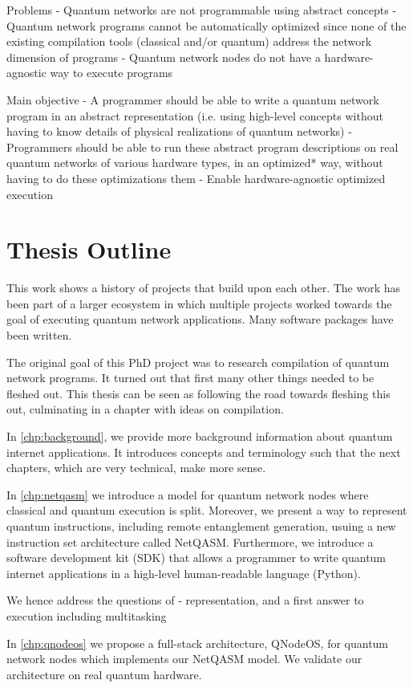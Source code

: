 Problems
- Quantum networks are not programmable using abstract concepts
- Quantum network programs cannot be automatically optimized since none of the existing compilation tools (classical and/or quantum) address the network dimension of programs
- Quantum network nodes do not have a hardware-agnostic way to execute programs

Main objective
- A programmer should be able to write a quantum network program in an abstract representation (i.e. using high-level concepts without having to know details of physical realizations of quantum networks)
- Programmers should be able to run these abstract program descriptions on real quantum networks of various hardware types, in an optimized* way, without having to do these optimizations them
- Enable hardware-agnostic optimized execution

\section{Thesis Outline}
This work shows a history of projects that build upon each other.
The work has been part of a larger ecosystem in which multiple projects worked towards the goal of executing quantum network applications.
Many software packages have been written.

The original goal of this PhD project was to research compilation of quantum network programs.
It turned out that first many other things needed to be fleshed out.
This thesis can be seen as following the road towards fleshing this out, culminating in a chapter with ideas on compilation.

In \cref{chp:background}, we provide more background information about quantum internet applications.
It introduces concepts and terminology such that the next chapters, which are very technical, make more sense.

In \cref{chp:netqasm} we introduce a model for quantum network nodes where classical and quantum execution is split.
Moreover, we present a way to represent quantum instructions, including remote entanglement generation, usuing a new instruction set architecture called NetQASM.
Furthermore, we introduce a software development kit (SDK) that allows a programmer to write quantum internet applications in a high-level human-readable language (Python).

We hence address the questions of
- representation, and a first answer to execution including multitasking

In \cref{chp:qnodeos} we propose a full-stack architecture, QNodeOS, for quantum network nodes which implements our NetQASM model.
We validate our architecture on real quantum hardware.

